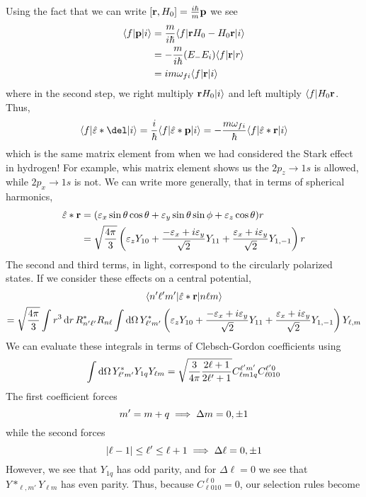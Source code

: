 Using the fact that we can write \([\mathbf{r},H_0] = \frac{i\hbar}{m}\mathbf{p}\)
we see
\begin{align*}
	\langle f\rvert \mathbf{p} \lvert i\rangle&= \frac{m}{i\hbar}\langle f\rvert \mathbf{r} H_0 - H_0 \mathbf{r}\lvert i\rangle\\
		       &=-\frac{m}{i\hbar} (E_-E_i) \langle f\rvert \mathbf{r}\lvert r\rangle\\
		       &= im\omega_{fi}\langle f\rvert\mathbf{r}\lvert i\rangle
\end{align*}
where in the second step, we right multiply \(\mathbf{r}H_0\lvert i\rangle\) and left multiply \(\langle f\rvert H_0\mathbf{r}\).
Thus,
\begin{equation}
	\b f \hat\varepsilon *\del \k i = \frac{i}{\hbar}\b f \hat \varepsilon*\vb p\k i = -\frac{m\omega_{fi}}{\hbar}\b f \hat\varepsilon * \vb r \k i
\end{equation}
which is the same matrix element from when we had considered the Stark effect in hydrogen! For example, whis matrix element shows us the \(2p_z\to1s\) is allowed, while \(2p_x\to 1s\) is not. We can write more generally, that in terms of spherical harmonics,
\begin{align*}
	\hat \varepsilon * \mathbf{r} &= (\varepsilon_x \sin\theta\cos\theta + \varepsilon_y\sin\theta\sin\phi + \varepsilon_z\cos\theta)r\\
				 &=\sqrt{\frac{4\pi}{3}}\left(\varepsilon_z Y_{10}+\frac{-\varepsilon_x+i\varepsilon_y}{\sqrt{2}}Y_{11}+\frac{\varepsilon_x+i\varepsilon_y}{\sqrt{2}}Y_{1,-1}\right)r
\end{align*}
The second and third terms, in light, correspond to the circularly polarized states. If we consider these effects on a central potential,
\begin{multline*}\b{n'\ell'm'}\hat\varepsilon*\vb r\k{n\ell m}\\=\sqrt{\frac{4\pi}{3}}\int r^3\d{r}R\ast_{n'\ell'}R_{n\ell}\int\d\Omega Y\ast_{\ell'm'} \left(\varepsilon_z Y_{10}+\frac{-\varepsilon_x+i\varepsilon_y}{\sqrt{2}}Y_{11}+\frac{\varepsilon_x+i\varepsilon_y}{\sqrt{2}}Y_{1,-1}\right)Y_{\ell,m}\end{multline*}
We can evaluate these integrals in terms of Clebsch-Gordon coefficients using
\begin{equation}
	\int\d\Omega Y\ast_{\ell'm'}Y_{1 q}Y_{\ell m} = \sqrt{\frac{3}{4\pi}\frac{2\ell+1}{2\ell'+1}}C_{\ell m1q}^{\ell'm'}C_{\ell 0 1 0}^{\ell' 0}
\end{equation}
The first coefficient forces
\[m'=m+q\implies \Delta m = 0,\pm 1\]
while the second forces
\[\left|\ell-1\right|\leq \ell' \leq \ell+1\implies \Delta\ell = 0,\pm 1\]
However, we see that \(Y_{1q}\) has odd parity, and for \(\Delta \ell =0\) we see that \(Y\ast_{\ell, m'}Y_{\ell m}\) has even parity. Thus, because \(C_{\ell010}^{\ell0} = 0\), our selection rules become
